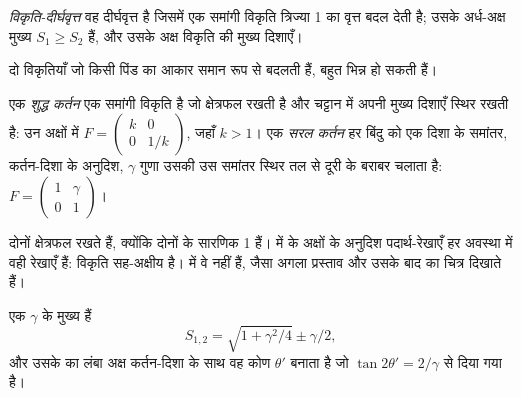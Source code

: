 \begin{definition}[विकृति-दीर्घवृत्त]
\label{def:b1:stress-strain-rheology:strain-ellipse}
\emph{विकृति-दीर्घवृत्त} वह दीर्घवृत्त है जिसमें एक समांगी विकृति त्रिज्या 1 का वृत्त बदल देती है; उसके अर्ध-अक्ष मुख्य  $S_1 \ge S_2$ हैं, और उसके अक्ष विकृति की मुख्य दिशाएँ।
\end{definition}

दो विकृतियाँ जो किसी पिंड का आकार समान रूप से बदलती हैं, बहुत भिन्न हो सकती हैं।

\begin{definition}[शुद्ध कर्तन, सरल कर्तन]
\label{def:b1:stress-strain-rheology:shear-types}
एक \emph{शुद्ध कर्तन} एक समांगी विकृति है जो क्षेत्रफल रखती है और चट्टान में अपनी मुख्य दिशाएँ स्थिर रखती है: उन अक्षों में $F = \begin{pmatrix} k & 0 \\ 0 & 1/k\end{pmatrix}$, जहाँ $k > 1$। एक \emph{सरल कर्तन} हर बिंदु को एक दिशा के समांतर, कर्तन-दिशा के अनुदिश, $\gamma$ गुणा उसकी उस समांतर स्थिर तल से दूरी के बराबर चलाता है: $F = \begin{pmatrix} 1 & \gamma \\ 0 & 1\end{pmatrix}$।
\end{definition}

दोनों क्षेत्रफल रखते हैं, क्योंकि दोनों के सारणिक 1 हैं।  में  के अक्षों के अनुदिश पदार्थ-रेखाएँ हर अवस्था में वही रेखाएँ हैं: विकृति सह-अक्षीय है।  में वे नहीं हैं, जैसा अगला प्रस्ताव और उसके बाद का चित्र दिखाते हैं।

\begin{proposition}[सरल कर्तन का दीर्घवृत्त]
\label{prop:b1:stress-strain-rheology:simple-shear}
एक  $\gamma$ के मुख्य  हैं
\[
  S_{1,2} = \sqrt{1 + \gamma^2/4} \pm \gamma/2 ,
\]
और उसके  का लंबा अक्ष कर्तन-दिशा के साथ वह कोण $\theta'$ बनाता है जो $\tan2\theta' = 2/\gamma$ से दिया गया है।
\end{proposition}

